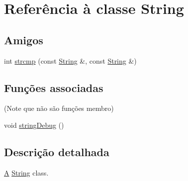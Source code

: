 \hypertarget{class_string}{\section{Referência à classe String}
\label{class_string}
}
\subsection*{Amigos}
\begin{DoxyCompactItemize}
\item 
int \hyperlink{class_string_ae3c243f0bc797b9e4b15d2ef5e5aaa7c}{strcmp} (const \hyperlink{class_string}{String} \&, const \hyperlink{class_string}{String} \&)
\end{DoxyCompactItemize}
\subsection*{Funções associadas}
(Note que não são funções membro) \begin{DoxyCompactItemize}
\item 
void \hyperlink{class_string_a5c07384b505d25ae6f61fc7abf0b0e61}{string\-Debug} ()
\end{DoxyCompactItemize}


\subsection{Descrição detalhada}
\hyperlink{class_a}{A} \hyperlink{class_string}{String} class. 

